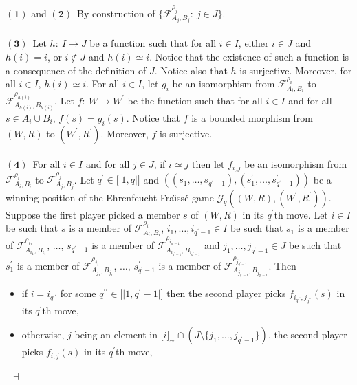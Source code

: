 \documentclass[draft]{article}
\newenvironment{proof}{{\bf Proof:}}{~$\dashv$\\}
\def\lsem{{\lbrack\mid}}
\def\rsem{{\mid\rbrack}}
\begin{document}
\begin{proof}
%
%
$\mathbf{(1)}$ and $\mathbf{(2)}$~By construction of $\{{\mathcal F}_{A_{j},B_{j}}^{\rho_{j}}:\ j{\in}J\}$.
%
%
\\
\\
%
%
$\mathbf{(3)}$~Let $h:\ I{\longrightarrow}J$ be a function such that for all $i{\in}I$, either $i{\in}J$ and $h(i){=}i$, or $i{\not\in}J$ and $h(i){\simeq}i$.
Notice that the existence of such a function is a consequence of the definition of $J$.
Notice also that $h$ is surjective.
Moreover, for all $i{\in}I$, $h(i){\simeq}i$.
For all $i{\in}I$, let $g_{i}$ be an isomorphism from ${\mathcal F}_{A_{i},B_{i}}^{\rho_{i}}$ to ${\mathcal F}_{A_{h(i)},B_{h(i)}}^{\rho_{h(i)}}$.
Let $f:\ W{\longrightarrow}W^{\prime}$ be the function such that for all $i{\in}I$ and for all $s{\in}A_{i}{\cup}B_{i}$, $f(s){=}g_{i}(s)$.
Notice that $f$ is a bounded morphism from $(W,R)$ to $(W^{\prime},R^{\prime})$.
Moreover, $f$ is surjective.
%
%
\\
\\
%
%
$\mathbf{(4)}$~For all $i{\in}I$ and for all $j{\in}J$, if $i{\simeq}j$ then let $f_{i,j}$ be an isomorphism from ${\mathcal F}_{A_{i},B_{i}}^{\rho_{i}}$ to ${\mathcal F}_{A_{j},B_{j}}^{\rho_{j}}$.
Let $q^{\prime}{\in}\lsem1,q\rsem$ and $((s_{1},\ldots,s_{q^{\prime}{-}1}),(s^{\prime}_{1},\ldots,s^{\prime}_{q^{\prime}{-}1}))$ be a winning position of the Ehrenfeucht-Fra\"\i ss\'e game ${\mathcal G}_{q}((W,R),(W^{\prime},R^{\prime}))$.
Suppose the first player picked a member $s$ of $(W,R)$ in its $q^{\prime}$th move.
Let $i{\in}I$ be such that $s$ is a member of ${\mathcal F}_{A_{i},B_{i}}^{\rho_{i}}$, $i_{1},\ldots,i_{q^{\prime}{-}1}{\in}I$ be such that $s_{1}$ is a member of ${\mathcal F}_{A_{i_{1}},B_{i_{1}}}^{\rho_{i_{1}}}$, $\ldots$, $s_{q^{\prime}{-}1}$ is a member of ${\mathcal F}_{A_{i_{q^{\prime}{-}1}},B_{i_{q^{\prime}{-}1}}}^{\rho_{i_{q^{\prime}{-}1}}}$ and $j_{1},\ldots,j_{q^{\prime}{-}1}{\in}J$ be such that $s^{\prime}_{1}$ is a member of ${\mathcal F}_{A_{j_{1}},B_{j_{1}}}^{\rho_{j_{1}}}$, $\ldots$, $s^{\prime}_{q^{\prime}{-}1}$ is a member of ${\mathcal F}_{A_{j_{q^{\prime}{-}1}},B_{j_{q^{\prime}{-}1}}}^{\rho_{j_{q^{\prime}{-}1}}}$.
Then
%
%
\begin{itemize}
%
%
\item if $i{=}i_{q^{\prime\prime}}$ for some $q^{\prime\prime}{\in}\lsem1,q^{\prime}{-}1\rsem$ then the second player picks $f_{i_{q^{\prime\prime}},j_{q^{\prime\prime}}}(s)$ in its $q^{\prime}$th move,
%
%
\item otherwise, $j$ being an element in $\lbrack i\rbrack_{\simeq}{\cap}(J{\setminus}\{j_{1},\ldots,j_{q^{\prime}{-}1}\})$, the second play\-er picks $f_{i,j}(s)$ in its $q^{\prime}$th move,

\end{itemize}
\end{proof}
\end{document}

